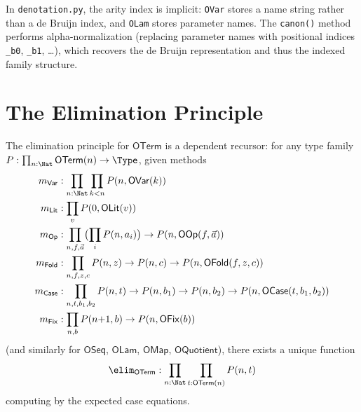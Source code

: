 \begin{remark}
In \texttt{denotation.py}, the arity index is implicit: \texttt{OVar}
stores a name string rather than a de Bruijn index, and \texttt{OLam}
stores parameter names.  The \texttt{canon()} method performs
alpha-normalization (replacing parameter names with positional
indices \texttt{\_b0}, \texttt{\_b1}, \ldots), which recovers the
de Bruijn representation and thus the indexed family structure.
\end{remark}

\section{The Elimination Principle}

\begin{definition}
\label{def:oterm-elim}
The elimination principle for $\mathsf{OTerm}$ is a dependent
recursor: for any type family $P : \prod_{n:\Nat}
\mathsf{OTerm}(n) \to \Type$, given methods
\begin{align}
  m_{\mathsf{Var}} &: \prod_{n:\Nat}\prod_{k < n} P(n, \mathsf{OVar}(k)) \\
  m_{\mathsf{Lit}} &: \prod_{v} P(0, \mathsf{OLit}(v)) \\
  m_{\mathsf{Op}} &: \prod_{n,f,\vec{a}}
    \bigl(\prod_i P(n, a_i)\bigr) \to P(n, \mathsf{OOp}(f,\vec{a})) \\
  m_{\mathsf{Fold}} &: \prod_{n,f,z,c}
    P(n,z) \to P(n,c) \to P(n, \mathsf{OFold}(f,z,c)) \\
  m_{\mathsf{Case}} &: \prod_{n,t,b_1,b_2}
    P(n,t) \to P(n,b_1) \to P(n,b_2) \to P(n, \mathsf{OCase}(t,b_1,b_2)) \\
  m_{\mathsf{Fix}} &: \prod_{n,b}
    P(n{+}1, b) \to P(n, \mathsf{OFix}(b))
\end{align}
(and similarly for $\mathsf{OSeq}$, $\mathsf{OLam}$, $\mathsf{OMap}$,
$\mathsf{OQuotient}$), there exists a unique function
\[
  \elim_{\mathsf{OTerm}} : \prod_{n:\Nat}\prod_{t:\mathsf{OTerm}(n)}
    P(n, t)
\]
computing by the expected case equations.
\end{definition}


